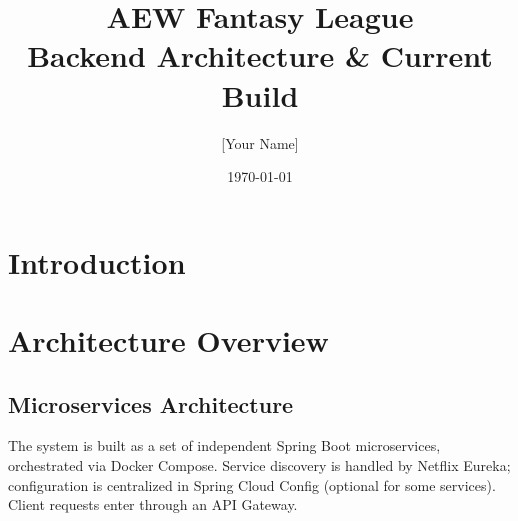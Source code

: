 \documentclass[11pt,a4paper]{article}
\title{\textbf{AEW Fantasy League} \\ Backend Architecture \& Current Build}
\author{[Your Name]}
\date{\today}
\begin{document}
\maketitle

\begin{abstract}
\end{abstract}

\tableofcontents
\newpage

\section{Introduction}

\section{Architecture Overview}

\subsection{Microservices Architecture}
The system is built as a set of independent Spring Boot microservices, orchestrated via Docker Compose. Service discovery is handled by Netflix Eureka; configuration is centralized in Spring Cloud Config (optional for some services). Client requests enter through an API Gateway.

\end{document}
